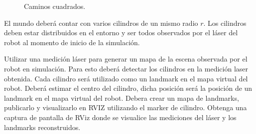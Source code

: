 \documentclass[tp]{lcc}
\begin{document}
\begin{figure}[!htbp]
    \centering
    \hspace{3cm}
    \caption{Caminos cuadrados.}
    \label{fig:trajectories}
\end{figure}

\ejercicio El mundo deberá contar con varios cilindros de un mismo radio $r$. Los cilindros deben estar distribuidos en el entorno y ser todos observados por el láser del robot al momento de inicio de la simulación.

Utilizar una medición láser para generar un mapa de la escena observada por el robot en simulación. Para esto deberá detectar los cilindros en la medición laser obtenida. Cada cilindro será utilizado como un landmark en el mapa virtual del robot. Deberá estimar el centro del cilindro, dicha posición será la posición de un landmark en el mapa virtual del robot. Debera crear un mapa de landmarks, publicarlo y visualizarlo en RVIZ utilizando el marker de cilindro.
Obtenga una captura de pantalla de RViz donde se visualice las mediciones del láser y los landmarks reconstruidos.


\printbibliography
\end{document}
